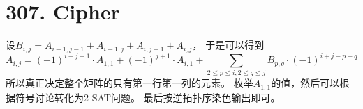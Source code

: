\section{307. Cipher}
设$B_{i,j}=A_{i-1,j-1}+A_{i-1,j}+A_{i,j-1}+A_{i,j}$，
于是可以得到
\begin{displaymath}
A_{i,j}=(-1)^{i+j+1} \cdot A_{1,1} + (-1)^{j+1} \cdot A_{i,1} + 
\sum_{2 \le p \le i, 2 \le q \le j} B_{p,q} \cdot (-1)^{i+j-p-q}
\end{displaymath}
所以真正决定整个矩阵的只有第一行第一列的元素。
枚举$A_{1,1}$的值，然后可以根据符号讨论转化为2-SAT问题。
最后按逆拓扑序染色输出即可。
